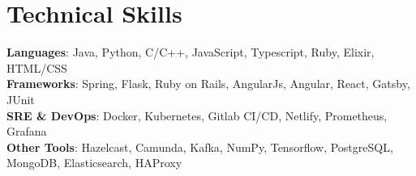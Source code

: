 \documentclass[letterpaper,11pt]{article}
\begin{document}
%
\section{Technical Skills}
 \begin{itemize}[leftmargin=0.15in, label={}]
    \small{\item{
     \textbf{Languages}{: Java, Python, C/C++, JavaScript, Typescript, Ruby, Elixir, HTML/CSS} \\
     \textbf{Frameworks}{: Spring, Flask, Ruby on Rails, AngularJs, Angular, React, Gatsby, JUnit} \\
     \textbf{SRE \& DevOps}{: Docker, Kubernetes, Gitlab CI/CD, Netlify, Prometheus, Grafana} \\
     \textbf{Other Tools}{: Hazelcast, Camunda, Kafka, NumPy, Tensorflow, PostgreSQL, MongoDB, Elasticsearch, HAProxy}
    }}
 \end{itemize}


\end{document}
